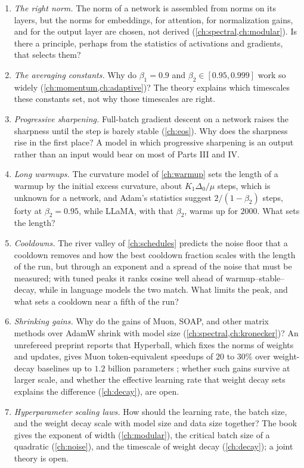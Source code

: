 \begin{refsection}
\begin{enumerate}
\item \emph{The right norm.} The norm of a network is assembled from norms on its layers, but the norms for embeddings, for attention, for normalization gains, and for the output layer are chosen, not derived (\cref{ch:spectral,ch:modular}). Is there a principle, perhaps from the statistics of activations and gradients, that selects them?
\item \emph{The averaging constants.} Why do $\beta_1=0.9$ and $\beta_2\in[0.95,0.999]$ work so widely (\cref{ch:momentum,ch:adaptive})? The theory explains which timescales these constants set, not why those timescales are right.
\item \emph{Progressive sharpening.} Full-batch gradient descent on a network raises the sharpness until the step is barely stable (\cref{ch:eos}). Why does the sharpness rise in the first place? A model in which progressive sharpening is an output rather than an input would bear on most of Parts III and IV.
\item \emph{Long warmups.} The curvature model of \cref{ch:warmup} sets the length of a warmup by the initial excess curvature, about $K_1\Delta_0/\mu$ steps, which is unknown for a network, and Adam's statistics suggest $2/(1-\beta_2)$ steps, forty at $\beta_2=0.95$, while LLaMA, with that $\beta_2$, warms up for $2000$. What sets the length?
\item \emph{Cooldowns.} The river valley of \cref{ch:schedules} predicts the noise floor that a cooldown removes and how the best cooldown fraction scales with the length of the run, but through an exponent and a spread of the noise that must be measured; with tuned peaks it ranks cosine well ahead of warmup--stable--decay, while in language models the two match. What limits the peak, and what sets a cooldown near a fifth of the run?
\item \emph{Shrinking gains.} Why do the gains of Muon, SOAP, and other matrix methods over AdamW shrink with model size (\cref{ch:spectral,ch:kronecker})? An unrefereed preprint reports that Hyperball, which fixes the norms of weights and updates, gives Muon token-equivalent speedups of $20$ to $30\%$ over weight-decay baselines up to $1.2$ billion parameters \parencite{WenEtAl2026Hyperball}; whether such gains survive at larger scale, and whether the effective learning rate that weight decay sets explains the difference (\cref{ch:decay}), are open.
\item \emph{Hyperparameter scaling laws.} How should the learning rate, the batch size, and the weight decay scale with model size and data size together? The book gives the exponent of width (\cref{ch:modular}), the critical batch size of a quadratic (\cref{ch:noise}), and the timescale of weight decay (\cref{ch:decay}); a joint theory is open.

\end{enumerate}
\end{refsection}
